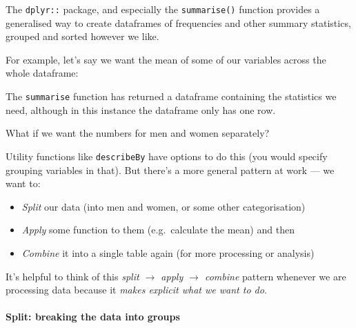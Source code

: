\documentclass[]{article}
\newenvironment{Shaded}{\begin{snugshade}}{\end{snugshade}}
\newcommand{\KeywordTok}[1]{\textcolor[rgb]{0.13,0.29,0.53}{\textbf{#1}}}
\newcommand{\DataTypeTok}[1]{\textcolor[rgb]{0.13,0.29,0.53}{#1}}
\newcommand{\StringTok}[1]{\textcolor[rgb]{0.31,0.60,0.02}{#1}}
\newcommand{\OperatorTok}[1]{\textcolor[rgb]{0.81,0.36,0.00}{\textbf{#1}}}
\newcommand{\NormalTok}[1]{#1}
\providecommand{\tightlist}{%
  \setlength{\itemsep}{0pt}\setlength{\parskip}{0pt}}
\let\oldparagraph\paragraph
\renewcommand{\paragraph}[1]{\oldparagraph{#1}\mbox{}}
\theoremstyle{definition}
\theoremstyle{definition}
\theoremstyle{definition}
\theoremstyle{remark}
\begin{document}
The \texttt{dplyr::} package, and especially the \texttt{summarise()}
function provides a generalised way to create dataframes of frequencies
and other summary statistics, grouped and sorted however we like.

For example, let's say we want the mean of some of our variables across
the whole dataframe:

\begin{Shaded}
\end{Shaded}

The \texttt{summarise} function has returned a dataframe containing the
statistics we need, although in this instance the dataframe only has one
row.

What if we want the numbers for men and women separately?

Utility functions like \texttt{describeBy} have options to do this (you
would specify grouping variables in that). But there's a more general
pattern at work --- we want to:

\begin{itemize}
\tightlist
\item
  \emph{Split} our data (into men and women, or some other
  categorisation)
\item
  \emph{Apply} some function to them (e.g.~calculate the mean) and then
\item
  \emph{Combine} it into a single table again (for more processing or
  analysis)
\end{itemize}

It's helpful to think of this \emph{split \(\rightarrow\) apply
\(\rightarrow\) combine} pattern whenever we are processing data because
it \emph{makes explicit what we want to do}.

\paragraph{Split: breaking the data into
groups}\label{split-breaking-the-data-into-groups}
\end{document}
